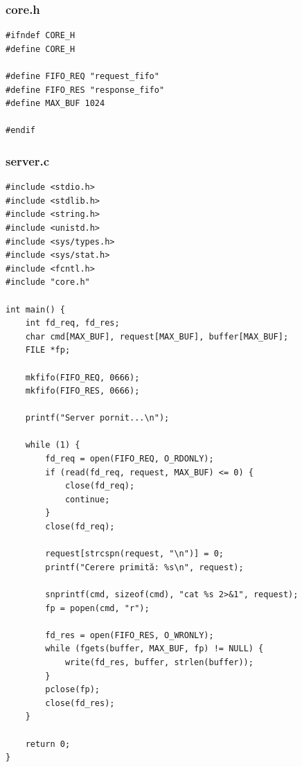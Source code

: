 \documentclass[11pt]{article}
\begin{document}
\subsubsection{core.h}
\label{sec:org8b2881a}
\begin{verbatim}
#ifndef CORE_H
#define CORE_H

#define FIFO_REQ "request_fifo"
#define FIFO_RES "response_fifo"
#define MAX_BUF 1024

#endif
\end{verbatim}
\subsubsection{server.c}
\label{sec:orgb5015e6}
\begin{verbatim}
#include <stdio.h>
#include <stdlib.h>
#include <string.h>
#include <unistd.h>
#include <sys/types.h>
#include <sys/stat.h>
#include <fcntl.h>
#include "core.h"

int main() {
    int fd_req, fd_res;
    char cmd[MAX_BUF], request[MAX_BUF], buffer[MAX_BUF];
    FILE *fp;

    mkfifo(FIFO_REQ, 0666);
    mkfifo(FIFO_RES, 0666);

    printf("Server pornit...\n");

    while (1) {
        fd_req = open(FIFO_REQ, O_RDONLY);
        if (read(fd_req, request, MAX_BUF) <= 0) {
            close(fd_req);
            continue;
        }
        close(fd_req);

        request[strcspn(request, "\n")] = 0;
        printf("Cerere primită: %s\n", request);

        snprintf(cmd, sizeof(cmd), "cat %s 2>&1", request);
        fp = popen(cmd, "r");
        
        fd_res = open(FIFO_RES, O_WRONLY);
        while (fgets(buffer, MAX_BUF, fp) != NULL) {
            write(fd_res, buffer, strlen(buffer));
        }
        pclose(fp);
        close(fd_res);
    }

    return 0;
}
\end{verbatim}
\end{document}
